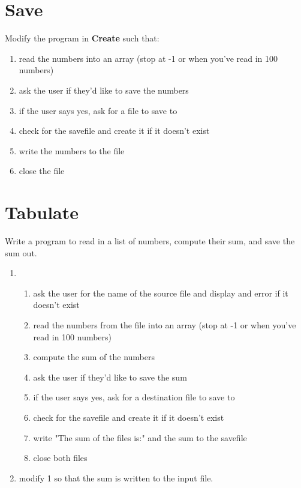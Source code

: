 \documentclass{article}
\begin{document}
\section*{Save}
Modify the program in \textbf{Create} such that:
\begin{enumerate}
	\item read the numbers into an array (stop at -1 or when you've read in 100 numbers)
	\item ask the user if they'd like to save the numbers
	\item if the user says yes, ask for a file to save to
	\item check for the savefile and create it if it doesn't exist
	\item write the numbers to the file
	\item close the file
\end{enumerate}

\section*{Tabulate}
Write a program to read in a list of numbers, compute their sum, and save the sum out. 
\begin{enumerate}
	\item
	\begin{enumerate}
		\item ask the user for the name of the source file and display and error if it doesn't exist
		\item read the numbers from the file into an array (stop at -1 or when you've read in 100 numbers)
		\item compute the sum of the numbers
		\item ask the user if they'd like to save the sum
		\item if the user says yes, ask for a destination file to save to
		\item check for the savefile and create it if it doesn't exist
		\item write "The sum of the files is:" and the sum to the savefile
		\item close both files
	\end{enumerate}
	\item modify 1 so that the sum is written to the input file.
\end{enumerate}
\end{document}
